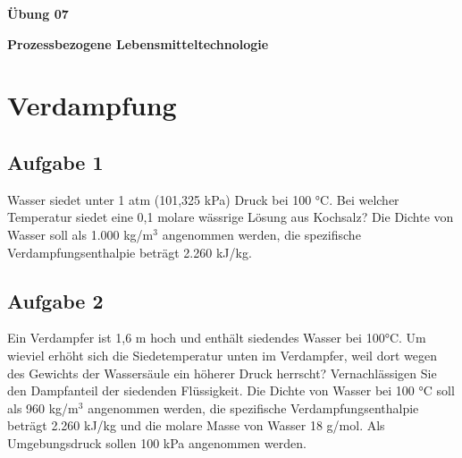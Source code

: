 \documentclass[a4paper,11pt]{article}
\newif\ifshowme
\begin{document}

\bckgrnd

\begin{center}
\LARGE
\color{white}
\textbf{Übung 07} \par \vspace*{2mm}
\large \color{miugray} \textbf{Prozessbezogene Lebensmitteltechnologie}
\end{center}
\par 
\vspace*{6mm}


\color{miudiutex}
\section*{Verdampfung}

\subsection*{Aufgabe 1}
Wasser siedet unter 1 atm (101,325 kPa) Druck bei 100 °C. Bei welcher Temperatur siedet
eine 0,1 molare wässrige Lösung aus Kochsalz? Die Dichte von Wasser soll als 1.000 kg/m$^3$ angenommen werden, die spezifische Verdampfungsenthalpie beträgt 2.260 kJ/kg. 

\pp
\ifshowme
\antwort{

Formel zur Bearbeitung der Aufgabe:
\begin{align*}
\Delta T \approx \frac{R \cdot T_L^2}{\rho_L \cdot \Delta h_v} \cdot c_i
\end{align*}
Werte einsetzen:
\begin{align*}
\Delta T &\approx \frac{8,314 ~\text{J/K mol} \cdot (373,15 ~\text{K})^2}{1.000 ~\text{kg/m$^3$} \cdot 2,26 \cdot 10^6 ~\text{J/kg}} \cdot 0,2 \cdot 10^{3}~\text{mol/m}^3 \\
&\approx 0,1 ~\text{K}
\end{align*}
}
\else
\fi

\subsection*{Aufgabe 2}
Ein Verdampfer ist 1,6 m hoch und enthält siedendes Wasser bei 100°C. Um wieviel erhöht
sich die Siedetemperatur unten im Verdampfer, weil dort wegen des Gewichts der
Wassersäule ein höherer Druck herrscht? Vernachlässigen Sie den Dampfanteil der
siedenden Flüssigkeit. Die Dichte von Wasser bei 100 °C soll als 960 kg/m$^3$
 angenommen werden, die spezifische Verdampfungsenthalpie beträgt 2.260 kJ/kg und die molare Masse
von Wasser 18 g/mol. Als Umgebungsdruck sollen 100 kPa angenommen werden. 
\end{document}

